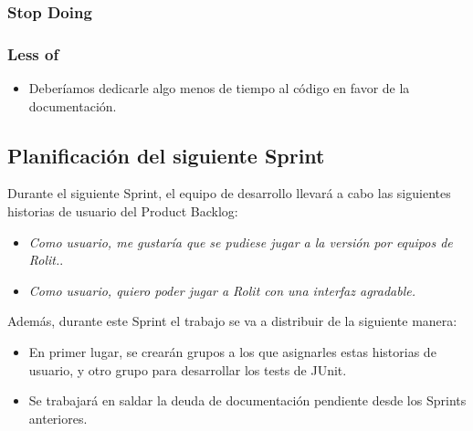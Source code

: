 \documentclass[../../FINAL/Scrum/SCRUM.tex]{subfiles}
\begin{document}
\subsubsection*{Stop Doing}


\subsubsection*{Less of}
\begin{itemize}
\item Deberíamos dedicarle algo menos de tiempo al código en favor de la documentación.
\end{itemize}

\subsection{Planificación del siguiente Sprint}
Durante el siguiente Sprint, el equipo de desarrollo llevará a cabo las siguientes historias de usuario del Product Backlog:
\begin{itemize}
\item \textit{Como usuario, me gustaría que se pudiese jugar a la versión por equipos de Rolit.}.
\item \textit{Como usuario, quiero poder jugar a Rolit con una interfaz agradable.}

\end{itemize}
Además, durante este Sprint el trabajo se va a distribuir de la siguiente manera:
\begin{itemize}
\item En primer lugar, se crearán grupos a los que asignarles estas historias de usuario, y otro grupo para desarrollar los tests de JUnit.
\item Se trabajará en saldar la deuda de documentación pendiente desde los Sprints anteriores.

\end{itemize}
\end{document}
